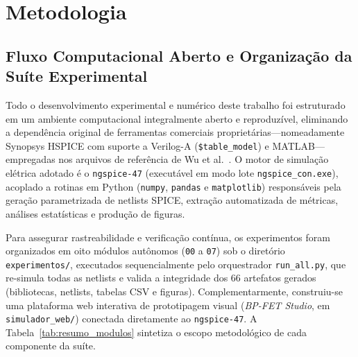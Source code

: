 \section{Metodologia}\label{sec:metodologia}

\subsection{Fluxo Computacional Aberto e Organiza\c{c}\~{a}o da Su\'{i}te Experimental}\label{sec:met_fluxo}

Todo o desenvolvimento experimental e num\'{e}rico deste trabalho foi estruturado em um ambiente computacional integralmente aberto e reproduz\'{i}vel, eliminando a depend\^{e}ncia original de ferramentas comerciais propriet\'{a}rias---nomeadamente Synopsys HSPICE com suporte a Verilog-A (\texttt{\$table\_model}) e MATLAB---empregadas nos arquivos de refer\^{e}ncia de Wu et al.~\cite{wu2020reconfigurable}. O motor de simula\c{c}\~{a}o el\'{e}trica adotado \'{e} o \texttt{ngspice-47} (execut\'{a}vel em modo lote \texttt{ngspice\_con.exe}), acoplado a rotinas em Python (\texttt{numpy}, \texttt{pandas} e \texttt{matplotlib}) respons\'{a}veis pela gera\c{c}\~{a}o parametrizada de netlists SPICE, extra\c{c}\~{a}o automatizada de m\'{e}tricas, an\'{a}lises estat\'{i}sticas e produ\c{c}\~{a}o de figuras.

Para assegurar rastreabilidade e verifica\c{c}\~{a}o cont\'{i}nua, os experimentos foram organizados em oito m\'{o}dulos aut\^{o}nomos (\texttt{00} a \texttt{07}) sob o diret\'{o}rio \texttt{experimentos/}, executados sequencialmente pelo orquestrador \texttt{run\_all.py}, que re-simula todas as netlists e valida a integridade dos 66 artefatos gerados (bibliotecas, netlists, tabelas CSV e figuras). Complementarmente, construiu-se uma plataforma web interativa de prototipagem visual (\textit{BP-FET Studio}, em \texttt{simulador\_web/}) conectada diretamente ao \texttt{ngspice-47}. A Tabela~\ref{tab:resumo_modulos} sintetiza o escopo metodol\'{o}gico de cada componente da su\'{i}te.

